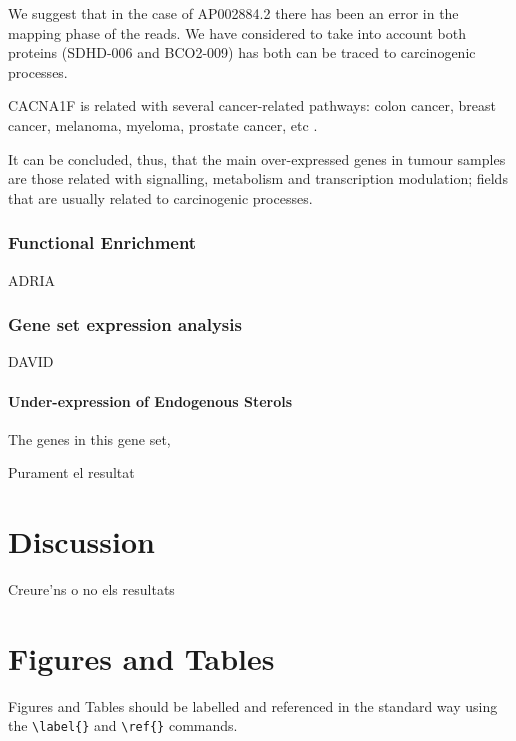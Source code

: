 \documentclass[9pt,twocolumn,twoside]{gsajnl}
\begin{document}
We suggest that in the case of AP002884.2 there has been an error in the mapping phase of the reads. We have considered to take into account both proteins (SDHD-006 and BCO2-009) has both can be traced to carcinogenic processes.

CACNA1F is related with several cancer-related pathways: colon cancer, breast cancer, melanoma, myeloma, prostate cancer, etc \cite{tcng}.

It can be concluded, thus, that the main over-expressed genes in tumour samples are those related with signalling, metabolism and transcription modulation; fields that are usually related to carcinogenic processes.

\subsubsection*{Functional Enrichment}
ADRIA
\subsubsection*{Gene set expression analysis}
DAVID


\paragraph{Under-expression of Endogenous Sterols } The genes in this gene set,


Purament el resultat


\section*{Discussion}

Creure'ns o no els resultats

\section*{Figures and Tables}

Figures and Tables should be labelled and referenced in the standard way using the \verb|\label{}| and \verb|\ref{}| commands.
\end{document}
